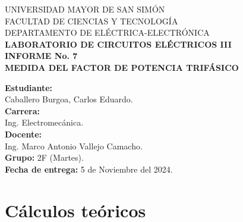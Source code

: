 \documentclass[letter,11pt]{article}
\begin{document}
\begin{titlepage}
    \begin{center}
        {\Large UNIVERSIDAD MAYOR DE SAN SIMÓN}\\
        \vspace*{0.15cm}
        {\large FACULTAD DE CIENCIAS Y TECNOLOGÍA}\\
        \vspace*{0.10cm}
        DEPARTAMENTO DE ELÉCTRICA-ELECTRÓNICA\\
        \vspace*{3.0cm}
        {\Large \textbf{LABORATORIO DE CIRCUITOS ELÉCTRICOS III}}\\
        \vspace*{0.3cm}
        {\Large \textbf{INFORME No. 7}}\\
        \vspace*{3.5cm}
        {\Large \textbf{MEDIDA DEL FACTOR DE POTENCIA TRIFÁSICO}}\\
    \end{center}

    \vspace*{5.3cm}
    \leftskip=7.95cm
    \noindent
    \textbf{Estudiante:}\\
    Caballero Burgoa, Carlos Eduardo.\\
    \newline
    \textbf{Carrera:}\\
    Ing. Electromecánica.\\
    \newline
    \textbf{Docente:}\\
    Ing. Marco Antonio Vallejo Camacho.\\
    \newline
    \textbf{Grupo:} 2F (Martes).\\
\textbf{Fecha de entrega:} 5 de Noviembre del 2024.\\
\end{titlepage}

\section{Cálculos teóricos}
\end{document}

